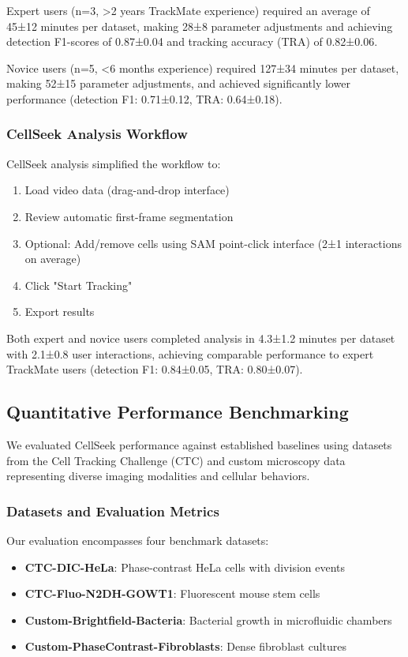 \documentclass[12pt]{article}
\begin{document}
Expert users (n=3, >2 years TrackMate experience) required an average of 45±12 minutes per dataset, making 28±8 parameter adjustments and achieving detection F1-scores of 0.87±0.04 and tracking accuracy (TRA) of 0.82±0.06.

Novice users (n=5, <6 months experience) required 127±34 minutes per dataset, making 52±15 parameter adjustments, and achieved significantly lower performance (detection F1: 0.71±0.12, TRA: 0.64±0.18).

\subsubsection{CellSeek Analysis Workflow}

CellSeek analysis simplified the workflow to:
\begin{enumerate}
  \item Load video data (drag-and-drop interface)
  \item Review automatic first-frame segmentation
  \item Optional: Add/remove cells using SAM point-click interface (2±1 interactions on average)
  \item Click "Start Tracking"
  \item Export results
\end{enumerate}

Both expert and novice users completed analysis in 4.3±1.2 minutes per dataset with 2.1±0.8 user interactions, achieving comparable performance to expert TrackMate users (detection F1: 0.84±0.05, TRA: 0.80±0.07).

\subsection{Quantitative Performance Benchmarking}

We evaluated CellSeek performance against established baselines using datasets from the Cell Tracking Challenge (CTC) and custom microscopy data representing diverse imaging modalities and cellular behaviors.

\subsubsection{Datasets and Evaluation Metrics}

Our evaluation encompasses four benchmark datasets:
\begin{itemize}
  \item \textbf{CTC-DIC-HeLa}: Phase-contrast HeLa cells with division events
  \item \textbf{CTC-Fluo-N2DH-GOWT1}: Fluorescent mouse stem cells
  \item \textbf{Custom-Brightfield-Bacteria}: Bacterial growth in microfluidic chambers
  \item \textbf{Custom-PhaseContrast-Fibroblasts}: Dense fibroblast cultures
\end{itemize}
\end{document}
